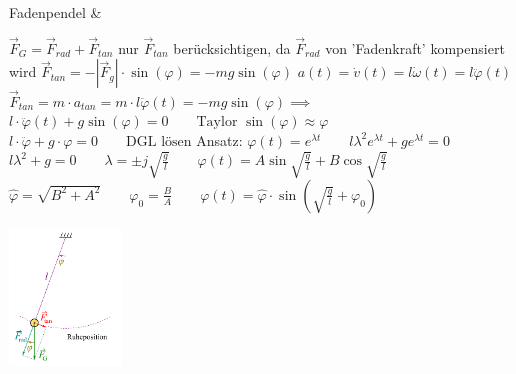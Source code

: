Fadenpendel & 
\begin{minipage}{11cm}
	$\vec{F}_G = \vec{F}_{rad} + \vec{F}_{tan}$\newline 
	nur $\vec{F}_{tan}$ berücksichtigen, da $\vec{F}_{rad}$ von 'Fadenkraft' kompensiert wird
	$\vec{F}_{tan} = -|\vec{F}_g|\cdot \sin(\varphi) = -mg \sin(\varphi)$\qquad 
	$ a(t) = \dot v(t) = l\dot \omega(t) = l\ddot \varphi(t) $
	$\vec{F}_{tan} = m \cdot a_{tan} = m\cdot l\ddot \varphi(t) = -mg\sin(\varphi) \implies$ \newline 
	$l\cdot \ddot \varphi(t) + g\sin(\varphi) = 0 \qquad \text{Taylor } \sin(\varphi) \approx \varphi$\newline  
	$l\cdot \ddot \varphi + g\cdot \varphi =0 \qquad \text{DGL lösen}$\newline 
	Ansatz: $\varphi(t) = e^{\lambda t} \qquad l\lambda^2 e^{\lambda t} + g e^{\lambda t} = 0$\newline
	$l\lambda^2 + g = 0 \qquad \lambda = \pm j\sqrt{\frac{g}{l}} \qquad \varphi(t) = A\sin\sqrt{\frac{g}{l}} + B\cos\sqrt{\frac{g}{l}}$\newline
	$\hat\varphi = \sqrt{B^2+ A^2}\qquad \varphi_0 = \frac{B}{A}\qquad \boxed{\varphi(t) = \hat \varphi\cdot \sin\left( \sqrt{\frac{g}{l}} + \varphi_0 \right)}$ 
\end{minipage}\begin{minipage}{3cm}
	\includegraphics[width = 3cm]{images/fadenpendel}
\end{minipage}





\\	